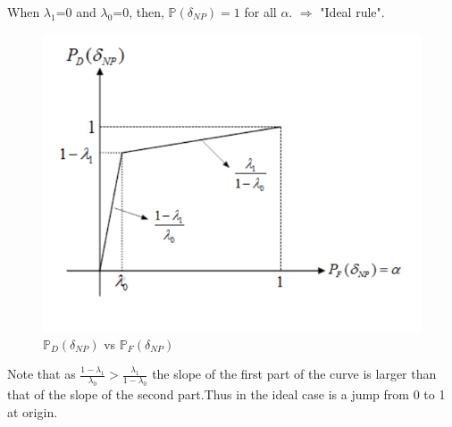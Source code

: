 \documentclass[12pt]{report}
\begin{document}
When $\lambda_1$=0 and $\lambda_0$=0, then, $\mathbb{P}(\delta_{NP})=1$ for all $\alpha$. $\Rightarrow$ "Ideal rule".\\
\begin{figure}[h]
\centering
\includegraphics[scale=0.75]{Figures/plot1_snip}
\caption{$\mathbb{P}_D(\delta_{NP})$ vs $\mathbb{P}_F(\delta_{NP})$}
\end{figure}
Note that as $\frac{1-\lambda_1}{\lambda_0}>\frac{\lambda_1}{1-\lambda_0}$
the slope of the first part of the curve is larger than that of the slope of the second part.Thus in the ideal case is a jump from 0 to 1 at origin.\\
\end{document}
